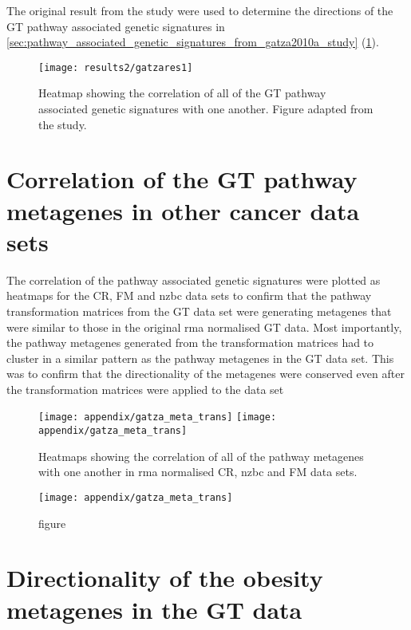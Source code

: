 	The original result from the \citet{Gatza2010a} study were used to determine the directions of the GT pathway associated genetic signatures in \cref{sec:pathway_associated_genetic_signatures_from_gatza2010a_study} (\cref{fig:gatza_paper_res}).

	\begin{figure}[htpb]
		\centering
		\texttt{[image: results2/gatzares1]}
		\caption[]{Heatmap showing the correlation of all of the GT pathway associated genetic signatures with one another.
		Figure adapted from the \citet{Gatza2010a} study.}
		\label{fig:gatza_paper_res}
	\end{figure}

	\section{Correlation of the GT pathway metagenes in other cancer data sets}
	\label{sec:correlation_of_the_gt_pathway_metagenes_in_other_cancer_data_sets}

	The correlation of the pathway associated genetic signatures were plotted as heatmaps for the CR, FM and \gls{nzbc} data sets to confirm that the pathway transformation matrices from the GT data set were generating metagenes that were similar to those in the original \gls{rma} normalised GT data.
	Most importantly, the pathway metagenes generated from the transformation matrices had to cluster in a similar pattern as the pathway metagenes in the GT data set.
	This was to confirm that the directionality of the metagenes were conserved even after the transformation matrices were applied to the data set

	\begin{figure}[htp!]
		\centering
		\texttt{[image: appendix/gatza\_meta\_trans]}
		\texttt{[image: appendix/gatza\_meta\_trans]}
		\caption[]{Heatmaps showing the correlation of all of the pathway metagenes with one another in \gls{rma} normalised CR, \gls{nzbc} and FM data sets.
		}
		\label{fig:appendix/gt_meta_rma_mas}
	\end{figure}

	\begin{figure}[htpb]
		\ContinuedFloat
		\captionsetup{list=off,format=cont}
		\centering
		\texttt{[image: appendix/gatza\_meta\_trans]}
		\caption[]{figure}
	\end{figure}

	\section{Directionality of the obesity metagenes in the GT data}
	\label{sec:directionality_of_the_obesity_metagenes_in_the_gt_data}

